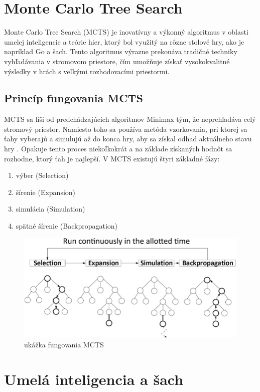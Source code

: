 \documentclass[10pt,twoside,slovak,a4paper]{article}
\begin{document}
\section{Monte Carlo Tree Search} \label{MonteCarlo}
Monte Carlo Tree Search (MCTS) je inovatívny a výkonný algoritmus v oblasti umelej inteligencie a teórie hier, ktorý bol využitý na rôzne stolové hry, ako je napríklad Go a šach. Tento algoritmus výrazne prekonáva tradičné techniky vyhľadávania v stromovom priestore, čím umožňuje získať vysokokvalitné výsledky v hrách s veľkými rozhodovacími priestormi.

\subsection{Princíp fungovania MCTS} \label{PrincipMTCS}
MCTS sa líši od predchádzajúcich algoritmov Minimax tým, že neprehľadáva celý stromový priestor. Namiesto toho sa používa metóda vzorkovania, pri ktorej sa ťahy vyberajú a simulujú až do konca hry, aby sa získal odhad aktuálneho stavu hry \cite{MCTS}. Opakuje tento proces niekoľkokrát a na základe získaných hodnôt sa rozhodne, ktorý ťah je najlepší. V MCTS existujú štyri základné fázy:
\begin{enumerate}
	\item výber (Selection)
	\item šírenie (Expansion)
	\item simulácia (Simulation)
	\item spätné šírenie (Backpropagation)
\end{enumerate}

\begin{figure}[h]
    \centering
    \includegraphics[width=\textwidth]{MCTS}
    \caption{ukážka fungovania MCTS}
    \label{obr3}
\end{figure}


\section{Umelá inteligencia a šach} \label{AI}
\end{document}
